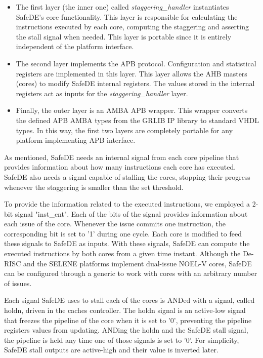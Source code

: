 \begin{itemize}
    \item The first layer (the inner one) called \textit{staggering\_handler} instantiates SafeDE's core functionality. This layer is responsible for calculating the instructions executed by each core, computing the staggering and asserting the stall signal when needed. This layer is portable since it is entirely independent of the platform interface. 
    \item The second layer implements the APB protocol. Configuration and statistical registers are implemented in this layer. This layer allows the AHB masters (cores) to modify SafeDE internal registers. The values stored in the internal registers act as inputs for the \textit{staggering\_handler} layer.
    \item Finally, the outer layer is an AMBA APB wrapper. This wrapper converts the defined APB AMBA types from the GRLIB IP library to standard VHDL types. In this way, the first two layers are completely portable for any platform implementing APB interface.
\end{itemize}

As mentioned, SafeDE needs an internal signal from each core pipeline that provides information about how many instructions each core has executed. SafeDE also needs a signal capable of stalling the cores, stopping their progress whenever the staggering is smaller than the set threshold. 

To provide the information related to the executed instructions, we employed a 2-bit signal "inst\_cnt". Each of the bits of the signal provides information about each issue of the core. Whenever the issue commits one instruction, the corresponding bit is set to '1' during one cycle. Each core is modified to feed these signals to SafeDE as inputs. With these signals, SafeDE can compute the executed instructions by both cores from a given time instant. Although the De-RISC and the SELENE platforms implement dual-issue NOEL-V cores, SafeDE can be configured through a generic to work with cores with an arbitrary number of issues. 

Each signal SafeDE uses to stall each of the cores is ANDed with a signal, called holdn, driven in the caches controller. The holdn signal is an active-low signal that freezes the pipeline of the core when it is set to '0', preventing the pipeline registers values from updating. ANDing the holdn and the SafeDE stall signal, the pipeline is held any time one of those signals is set to '0'. For simplicity, SafeDE stall outputs are active-high and their value is inverted later. 

